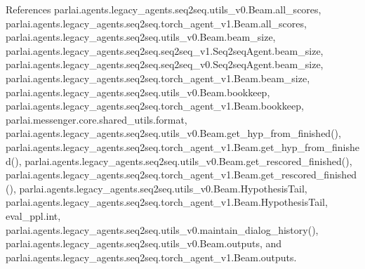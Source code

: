 References parlai.\+agents.\+legacy\+\_\+agents.\+seq2seq.\+utils\+\_\+v0.\+Beam.\+all\+\_\+scores, parlai.\+agents.\+legacy\+\_\+agents.\+seq2seq.\+torch\+\_\+agent\+\_\+v1.\+Beam.\+all\+\_\+scores, parlai.\+agents.\+legacy\+\_\+agents.\+seq2seq.\+utils\+\_\+v0.\+Beam.\+beam\+\_\+size, parlai.\+agents.\+legacy\+\_\+agents.\+seq2seq.\+seq2seq\+\_\+v1.\+Seq2seq\+Agent.\+beam\+\_\+size, parlai.\+agents.\+legacy\+\_\+agents.\+seq2seq.\+seq2seq\+\_\+v0.\+Seq2seq\+Agent.\+beam\+\_\+size, parlai.\+agents.\+legacy\+\_\+agents.\+seq2seq.\+torch\+\_\+agent\+\_\+v1.\+Beam.\+beam\+\_\+size, parlai.\+agents.\+legacy\+\_\+agents.\+seq2seq.\+utils\+\_\+v0.\+Beam.\+bookkeep, parlai.\+agents.\+legacy\+\_\+agents.\+seq2seq.\+torch\+\_\+agent\+\_\+v1.\+Beam.\+bookkeep, parlai.\+messenger.\+core.\+shared\+\_\+utils.\+format, parlai.\+agents.\+legacy\+\_\+agents.\+seq2seq.\+utils\+\_\+v0.\+Beam.\+get\+\_\+hyp\+\_\+from\+\_\+finished(), parlai.\+agents.\+legacy\+\_\+agents.\+seq2seq.\+torch\+\_\+agent\+\_\+v1.\+Beam.\+get\+\_\+hyp\+\_\+from\+\_\+finished(), parlai.\+agents.\+legacy\+\_\+agents.\+seq2seq.\+utils\+\_\+v0.\+Beam.\+get\+\_\+rescored\+\_\+finished(), parlai.\+agents.\+legacy\+\_\+agents.\+seq2seq.\+torch\+\_\+agent\+\_\+v1.\+Beam.\+get\+\_\+rescored\+\_\+finished(), parlai.\+agents.\+legacy\+\_\+agents.\+seq2seq.\+utils\+\_\+v0.\+Beam.\+Hypothesis\+Tail, parlai.\+agents.\+legacy\+\_\+agents.\+seq2seq.\+torch\+\_\+agent\+\_\+v1.\+Beam.\+Hypothesis\+Tail, eval\+\_\+ppl.\+int, parlai.\+agents.\+legacy\+\_\+agents.\+seq2seq.\+utils\+\_\+v0.\+maintain\+\_\+dialog\+\_\+history(), parlai.\+agents.\+legacy\+\_\+agents.\+seq2seq.\+utils\+\_\+v0.\+Beam.\+outputs, and parlai.\+agents.\+legacy\+\_\+agents.\+seq2seq.\+torch\+\_\+agent\+\_\+v1.\+Beam.\+outputs.

